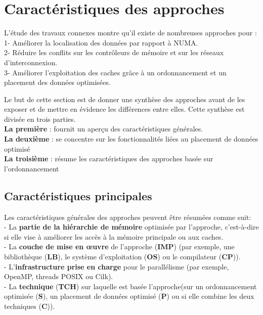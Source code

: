 \section{Caractéristiques des approches} \label{caracAppro}
L'étude des travaux connexes montre qu'il existe de nombreuses approches pour :\\ %
1- Améliorer la localisation des données par rapport à NUMA.\\
2- Réduire les conflits sur les contrôleurs de mémoire et sur les réseaux d’interconnexion.\\
3- Améliorer l'exploitation des caches grâce à un ordonnancement et un placement des données optimisées.

Le but de cette section est de donner une synthèse des approches avant de les exposer et de mettre en évidence les différences entre elles. 
Cette synthèse est divisée en trois parties. \\
\textbf{La première} : fournit un aperçu des caractéristiques générales. \\
\textbf{La deuxième} : se concentre sur les fonctionnalités liées au placement de données optimisé\\
\textbf{La troisième} : résume les caractéristiques des approches basée sur l'ordonnancement
%
\subsection{Caractéristiques principales}
Les caractéristiques générales des approches peuvent être résumées comme suit: \\
- La \textbf{partie de la hiérarchie de mémoire} optimisée par l'approche, c'est-à-dire si elle vise à améliorer les accès à la mémoire principale ou aux caches.\\ 
- La \textbf{couche de mise en œuvre} de l'approche (\textbf{IMP}) (par exemple, une bibliothèque (\textbf{LB}), le système d'exploitation (\textbf{OS}) ou le compilateur (\textbf{CP})).\\ 
- L'\textbf{infrastructure prise en charge} pour le parallélisme (par exemple, OpenMP, threads POSIX ou Cilk). \\
- La \textbf{technique} (\textbf{TCH}) sur laquelle est basée l'approche(sur un ordonnancement optimisée (\textbf{S}), un placement de données optimisé (\textbf{P}) ou si elle combine les deux techniques (\textbf{C})). 
%
